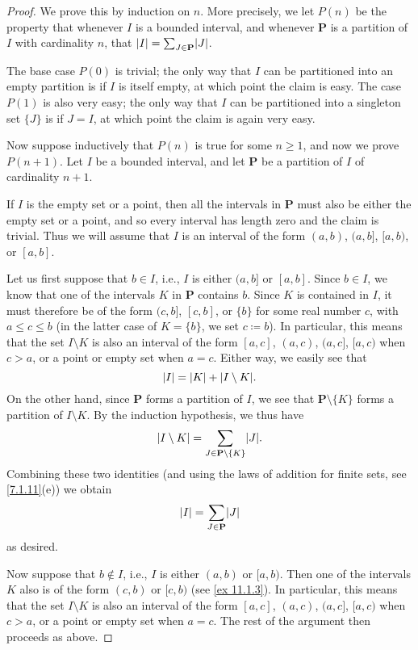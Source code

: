 \begin{proof}
  We prove this by induction on \(n\).
  More precisely, we let \(P(n)\) be the property that whenever \(I\) is a bounded interval, and whenever \(\mathbf{P}\) is a partition of \(I\) with cardinality \(n\), that \(\abs{I} = \sum_{J \in \mathbf{P}} \abs{J}\).

  The base case \(P(0)\) is trivial;
  the only way that \(I\) can be partitioned into an empty partition is if \(I\) is itself empty, at which point the claim is easy.
  The case \(P(1)\) is also very easy;
  the only way that \(I\) can be partitioned into a singleton set \(\{J\}\) is if \(J = I\), at which point the claim is again very easy.

  Now suppose inductively that \(P(n)\) is true for some \(n \geq 1\), and now we prove \(P(n + 1)\).
  Let \(I\) be a bounded interval, and let \(\mathbf{P}\) be a partition of \(I\) of cardinality \(n + 1\).

  If \(I\) is the empty set or a point, then all the intervals in \(\mathbf{P}\) must also be either the empty set or a point, and so every interval has length zero and the claim is trivial.
  Thus we will assume that \(I\) is an interval of the form \((a, b)\), \((a, b]\), \([a, b)\), or \([a, b]\).

      Let us first suppose that \(b \in I\), i.e., \(I\) is either \((a, b]\) or \([a, b]\).
  Since \(b \in I\), we know that one of the intervals \(K\) in \(\mathbf{P}\) contains \(b\).
  Since \(K\) is contained in \(I\), it must therefore be of the form \((c, b]\), \([c, b]\), or \(\{b\}\) for some real number \(c\), with \(a \leq c \leq b\) (in the latter case of \(K = \{b\}\), we set \(c \coloneqq b\)).
  In particular, this means that the set \(I \setminus K\) is also an interval of the form \([a, c]\), \((a, c)\), \((a, c]\), \([a, c)\) when \(c > a\), or a point or empty set when \(a = c\).
  Either way, we easily see that
  \[
    \abs{I} = \abs{K} + \abs{I \setminus K}.
  \]
  On the other hand, since \(\mathbf{P}\) forms a partition of \(I\), we see that \(\mathbf{P} \setminus \{K\}\) forms a partition of \(I \setminus K\).
  By the induction hypothesis, we thus have
  \[
    \abs{I \setminus K} = \sum_{J \in \mathbf{P} \setminus \{K\}} \abs{J}.
  \]
  Combining these two identities (and using the laws of addition for finite sets, see \cref{7.1.11}(e)) we obtain
  \[
    \abs{I} = \sum_{J \in \mathbf{P}} \abs{J}
  \]
  as desired.

  Now suppose that \(b \notin I\), i.e., \(I\) is either \((a, b)\) or \([a, b)\).
  Then one of the intervals \(K\) also is of the form \((c, b)\) or \([c, b)\) (see \cref{ex 11.1.3}).
      In particular, this means that the set \(I \setminus K\) is also an interval of the form \([a, c]\), \((a, c)\), \((a, c]\), \([a, c)\) when \(c > a\), or a point or empty set when \(a = c\).
  The rest of the argument then proceeds as above.
\end{proof}

